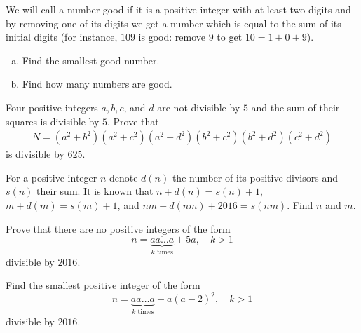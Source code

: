 \documentclass[problems.tex]{subfile}
\begin{document}
	
	\begin{problem}
		We will call a number good if it is a positive integer with at least two digits and by removing one of its digits we get a number which is equal to the sum of its initial digits (for instance, $109$ is good: remove $9$ to get $10 = 1 + 0 + 9$).
		\begin{enumerate}[(a)]
			\item Find the smallest good number.
			\item Find how many numbers are good.
		\end{enumerate}
	\end{problem}
	
	
	\begin{problem}
		Four positive integers $a, b, c$, and $d$ are not divisible by $5$ and the sum of their squares is divisible by $5$. Prove that
		\begin{align*}
			N = (a^2 + b^2)(a^2 + c^2)(a^2 + d^2)(b^2 + c^2)(b^2 + d^2)(c^2 + d^2)
		\end{align*}
		is divisible by $625$.
	\end{problem}
	
	
	
	\begin{problem}
		For a positive integer $n$ denote $d(n)$ the number of its positive divisors and $s(n)$ their sum. It is known that $n + d(n) = s(n) + 1$, $m + d(m) = s(m) + 1$, and $nm + d(nm) + 2016 = s(nm)$. Find $n$ and $m$.
	\end{problem}
	
	
	
	\begin{problem}
		Prove that there are no positive integers of the form $$n = \underbrace{\overline{aa\dots a}}_{k\text{ times}} + 5a , \quad k >1$$ divisible by $2016$.
	\end{problem}
	
	
	
	\begin{problem}
		Find the smallest positive integer of the form $$n = \underbrace{\overline{aa\dots a}}_{k\text{ times}} + a(a-2)^2 , \quad k >1$$ divisible by $2016$.
	\end{problem}
	
\end{document}
